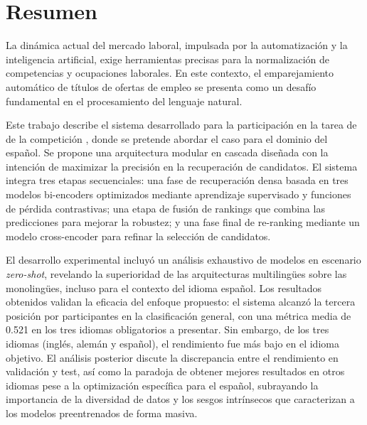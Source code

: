 \chapter*{Resumen}
\label{sec:Resumen}
\noindent La dinámica actual del mercado laboral, impulsada por la automatización y la inteligencia artificial, exige herramientas precisas para la normalización de competencias y ocupaciones laborales. En este contexto, el emparejamiento automático de títulos de ofertas de empleo se presenta como un desafío fundamental en el procesamiento del lenguaje natural.

Este trabajo describe el sistema desarrollado para la participación en la tarea de  de la competición , donde se pretende abordar el caso para el dominio del español. Se propone una arquitectura modular en cascada diseñada con la intención de maximizar la precisión en la recuperación de candidatos. El sistema integra tres etapas secuenciales: una fase de recuperación densa basada en tres modelos bi-encoders optimizados mediante aprendizaje supervisado y funciones de pérdida contrastivas; una etapa de fusión de rankings que combina las predicciones para mejorar la robustez; y una fase final de re-ranking mediante un modelo cross-encoder para refinar la selección de candidatos.

El desarrollo experimental incluyó un análisis exhaustivo de modelos en escenario \textit{zero-shot}, revelando la superioridad de las arquitecturas multilingües sobre las monolingües, incluso para el contexto del idioma español. Los resultados obtenidos validan la eficacia del enfoque propuesto: el sistema alcanzó la tercera posición por participantes en la clasificación general, con una métrica  media de 0.521 en los tres idiomas obligatorios a presentar. Sin embargo, de los tres idiomas (inglés, alemán y español), el rendimiento fue más bajo en el idioma objetivo. El análisis posterior discute la discrepancia entre el rendimiento en validación y test, así como la paradoja de obtener mejores resultados en otros idiomas pese a la optimización específica para el español, subrayando la importancia de la diversidad de datos y los sesgos intrínsecos que caracterizan a los modelos preentrenados de forma masiva.